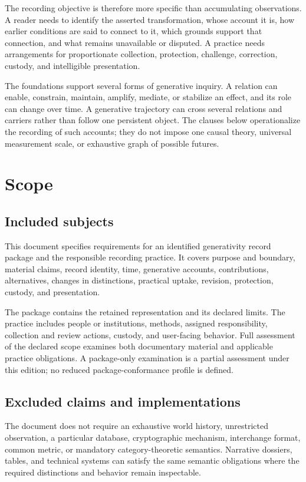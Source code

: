 \documentclass[11pt,a4paper]{article}
\begin{document}
The recording objective is therefore more specific than accumulating observations. A reader needs to identify the asserted transformation, whose account it is, how earlier conditions are said to connect to it, which grounds support that connection, and what remains unavailable or disputed. A practice needs arrangements for proportionate collection, protection, challenge, correction, custody, and intelligible presentation.

The foundations support several forms of generative inquiry. A relation can enable, constrain, maintain, amplify, mediate, or stabilize an effect, and its role can change over time. A generative trajectory can cross several relations and carriers rather than follow one persistent object. The clauses below operationalize the recording of such accounts; they do not impose one causal theory, universal measurement scale, or exhaustive graph of possible futures.

\GSPmainmatter
\section{Scope}
\subsection{Included subjects}
This document specifies requirements for an identified generativity record package and the responsible recording practice. It covers purpose and boundary, material claims, record identity, time, generative accounts, contributions, alternatives, changes in distinctions, practical uptake, revision, protection, custody, and presentation.

The package contains the retained representation and its declared limits. The practice includes people or institutions, methods, assigned responsibility, collection and review actions, custody, and user-facing behavior. Full assessment of the declared scope examines both documentary material and applicable practice obligations. A package-only examination is a partial assessment under this edition; no reduced package-conformance profile is defined.

\subsection{Excluded claims and implementations}
The document does not require an exhaustive world history, unrestricted observation, a particular database, cryptographic mechanism, interchange format, common metric, or mandatory category-theoretic semantics. Narrative dossiers, tables, and technical systems can satisfy the same semantic obligations where the required distinctions and behavior remain inspectable.
\end{document}
